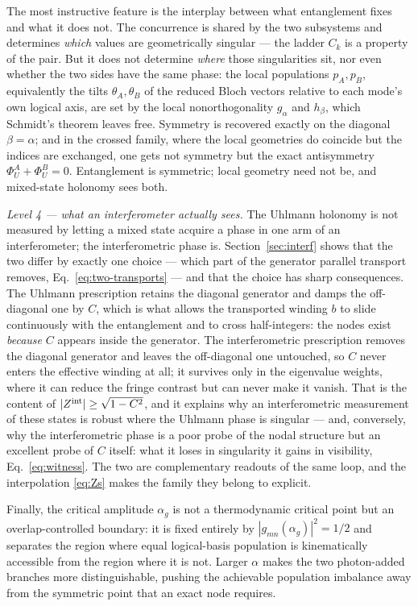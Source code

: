 \documentclass[11pt]{article}
\begin{document}
The most instructive feature is the interplay between what entanglement fixes
and what it does not. The concurrence is shared by the two subsystems and
determines \emph{which} values are geometrically singular --- the ladder $C_k$
is a property of the pair. But it does not determine \emph{where} those
singularities sit, nor even whether the two sides have the same phase: the
local populations $p_A,p_B$, equivalently the tilts $\theta_A,\theta_B$ of the
reduced Bloch vectors relative to each mode's own logical axis, are set by the
local nonorthogonality $g_\alpha$ and $h_\beta$, which Schmidt's theorem leaves
free. Symmetry is recovered exactly on the diagonal $\beta=\alpha$; and in the
crossed family, where the local geometries do coincide but the indices are
exchanged, one gets not symmetry but the exact antisymmetry
$\Phi_U^A+\Phi_U^B=0$. Entanglement is symmetric; local geometry need not be,
and mixed-state holonomy sees both.

\emph{Level 4 --- what an interferometer actually sees.} The Uhlmann holonomy
is not measured by letting a mixed state acquire a phase in one arm of an
interferometer; the interferometric phase is. Section~\ref{sec:interf} shows
that the two differ by exactly one choice --- which part of the generator
parallel transport removes, Eq.~\eqref{eq:two-transports} --- and that the
choice has sharp consequences. The Uhlmann prescription retains the diagonal
generator and damps the off-diagonal one by $C$, which is what allows the
transported winding $b$ to slide continuously with the entanglement and to
cross half-integers: the nodes exist \emph{because} $C$ appears inside the
generator. The interferometric prescription removes the diagonal generator and
leaves the off-diagonal one untouched, so $C$ never enters the effective
winding at all; it survives only in the eigenvalue weights, where it can reduce
the fringe contrast but can never make it vanish. That is the content of
$|Z^{\rm int}|\geq\sqrt{1-C^2}$, and it explains why an interferometric
measurement of these states is robust where the Uhlmann phase is singular ---
and, conversely, why the interferometric phase is a poor probe of the nodal
structure but an excellent probe of $C$ itself: what it loses in singularity it
gains in visibility, Eq.~\eqref{eq:witness}. The two are complementary
readouts of the same loop, and the interpolation \eqref{eq:Zs} makes the family
they belong to explicit.

Finally, the critical amplitude $\alpha_g$ is not a thermodynamic critical
point but an overlap-controlled boundary: it is fixed entirely by
$|g_{mn}(\alpha_g)|^2=1/2$ and separates the region where equal logical-basis
population is kinematically accessible from the region where it is not. Larger
$\alpha$ makes the two photon-added branches more distinguishable, pushing the
achievable population imbalance away from the symmetric point that an exact
node requires.
\end{document}
